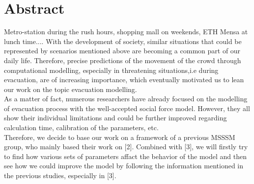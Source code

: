 \documentclass{article}
\begin{document}
\section{Abstract}


Metro-station during the rush hours, shopping mall on weekends, ETH Mensa at lunch time.... With the development of society, similar situations that could be represented by scenarios mentioned  above are becoming a common part of our daily life. Therefore, precise predictions of the movement of the crowd through computational modelling, especially in threatening situations,i.e during evacuation, are of increasing importance, which eventually motivated us to lean our work on the topic evacuation modelling.\\
As a matter of fact, numerous researchers have already focused on the modelling of evacuation process with the well-accepted social force model. However, they all show their individual limitations and could be further improved regarding calculation time, calibration of the parameters, etc. \\
Therefore, we decide to base our work on a framework of a previous MSSSM group, who mainly based their work on [2]. Combined with [3], we will firstly try to find how various sets of parameters affact the behavior of the model and then see how we could improve the model by following the information mentioned in the previous studies, especially in [3].
\end{document}
